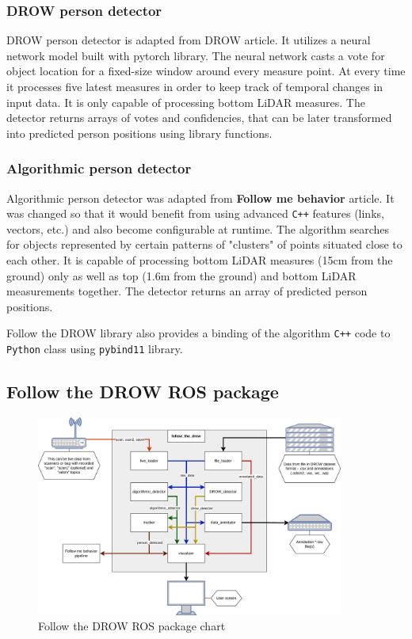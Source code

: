\documentclass{article}
\begin{document}
\subsubsection{DROW person detector}

DROW person detector is adapted from DROW\cite{DROW_2018} article.
It utilizes a neural network model built with pytorch\cite{pytorch_site} library.
The neural network casts a vote for object location for a fixed-size window around every measure point.
At every time it processes five latest measures in order to keep track of temporal changes in input data.
It is only capable of processing bottom LiDAR measures.
The detector returns arrays of votes and confidencies, that can be later transformed into predicted person positions using library functions.

\subsubsection{Algorithmic person detector}

Algorithmic person detector was adapted from \textbf{Follow me behavior} \cite{follow_me_behavior} article.
It was changed so that it would benefit from using advanced \texttt{C++} features (links, vectors, etc.) and also become configurable at runtime.
The algorithm searches for objects represented by certain patterns of "clusters" of points situated close to each other.
It is capable of processing bottom LiDAR measures (15cm from the ground) only as well as top (1.6m from the ground) and bottom LiDAR measurements together.
The detector returns an array of predicted person positions.

Follow the DROW library also provides a binding of the algorithm \texttt{C++} code to \texttt{Python} class using \texttt{pybind11}\cite{pybind_site} library.

\subsection{Follow the DROW ROS package}

\begin{figure}[t!]
	\centering
	\includegraphics[width=0.9\textwidth]{ftd_package_chart}
	\caption{Follow the DROW ROS package chart}
	\label{fig:ftd_package_chart}
\end{figure}
\end{document}
